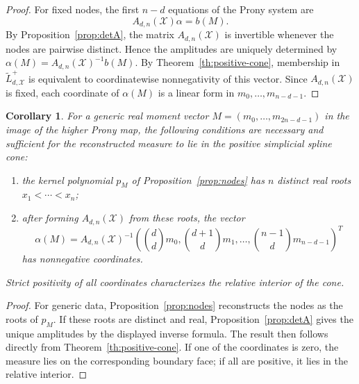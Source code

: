 \documentclass[reqno]{amsart}
\numberwithin{theorem}{section}
\newtheorem{corollary}[theorem]{Corollary}
\newcommand{\cX}{\mathcal{X}}
\begin{document}
\begin{proof}
For fixed nodes, the first $n-d$ equations of the Prony system are
\[
A_{d,n}(\cX)\alpha=b(M).
\]
By Proposition~\ref{prop:detA}, the matrix $A_{d,n}(\cX)$ is invertible whenever the nodes are pairwise distinct. Hence the amplitudes are uniquely determined by
$\alpha(M)=A_{d,n}(\cX)^{-1}b(M)$. By Theorem~\ref{th:positive-cone}, membership in $\widetilde L_{d,\cX}^+$ is equivalent to coordinatewise nonnegativity of this vector. Since $A_{d,n}(\cX)$ is fixed, each coordinate of $\alpha(M)$ is a linear form in $m_0,\dots,m_{n-d-1}$.
\end{proof}

\begin{corollary}\label{cor:moment-positivity-reconstructed}
For a generic real moment vector $M=(m_0,\dots,m_{2n-d-1})$ in the image of the higher Prony map, the following conditions are necessary and sufficient for the reconstructed measure to lie in the positive simplicial spline cone:
\begin{enumerate}
    \item the kernel polynomial $p_M$ of Proposition~\ref{prop:nodes} has $n$ distinct real roots $x_1<\cdots <x_n$;
    \item after forming $A_{d,n}(\cX)$ from these roots, the vector
    \[
    \alpha(M)=A_{d,n}(\cX)^{-1}
    \left(\binom{d}{d}m_0,\binom{d+1}{d}m_1,
    \dots,
    \binom{n-1}{d}m_{n-d-1}\right)^T
    \]
    has nonnegative coordinates.
\end{enumerate}
Strict positivity of all coordinates characterizes the relative interior of the cone.
\end{corollary}

\begin{proof}
For generic data, Proposition~\ref{prop:nodes} reconstructs the nodes as the roots of $p_M$. If these roots are distinct and real, Proposition~\ref{prop:detA} gives the unique amplitudes by the displayed inverse formula. The result then follows directly from Theorem~\ref{th:positive-cone}. If one of the coordinates is zero, the measure lies on the corresponding boundary face; if all are positive, it lies in the relative interior.
\end{proof}
\end{document}
